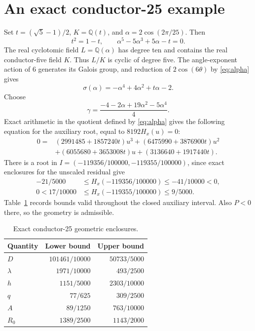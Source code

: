 \documentclass[noproofs]{rmj-public}
\theoremstyle{definition}
\numberwithin{equation}{section}
\newcommand{\Q}{\mathbb Q}
\begin{document}
\section{An exact conductor-25 example}\label{sec:example}

Set $t=(\sqrt5-1)/2$, $K=\Q(t)$, and
$\alpha=2\cos(2\pi/25)$. Then
\begin{equation}\label{eq:alpha}
t^2=1-t,\qquad \alpha^5-5\alpha^3+5\alpha-t=0.
\end{equation}
The real cyclotomic field $L=\Q(\alpha)$ has degree ten and contains
the real conductor-five field $K$. Thus $L/K$ is cyclic of degree five.
The angle-exponent action of 6 generates its Galois group, and reduction
of $2\cos(6\theta)$ by \eqref{eq:alpha} gives
\[
\sigma(\alpha)=-\alpha^4+4\alpha^2+t\alpha-2.
\]
Choose
\begin{equation}\label{eq:gamma25}
\gamma=\frac{-4-2\alpha+19\alpha^2-5\alpha^4}{4}.
\end{equation}
Exact arithmetic in the quotient defined by \eqref{eq:alpha} gives the
following equation for the auxiliary root, equal to $8192H_x(u)=0$:
\begin{equation}\label{eq:cubic25}
\begin{split}
0={}&(2991485+1857240t)u^3+(6475990+3876900t)u^2\\
&+(6055680+3653008t)u+(3136640+1917440t).
\end{split}
\end{equation}
There is a root in $I=(-119356/100000,-119355/100000)$, since exact
enclosures for the unscaled residual give
\begin{align*}
-21/5000&\le H_x(-119356/100000)\le-41/10000<0,\\
0<17/10000&\le H_x(-119355/100000)\le9/5000.
\end{align*}
Table~\ref{tab:example} records bounds valid throughout the closed
auxiliary interval. Also $P<0$ there, so the geometry is admissible.

\begin{table}[ht]
\centering
\caption{Exact conductor-25 geometric enclosures.}\label{tab:example}
\begin{tabular}{lrr}
\toprule Quantity&Lower bound&Upper bound\\\midrule
$D$&$101461/10000$&$50733/5000$\\
$\lambda$&$1971/10000$&$493/2500$\\
$h$&$1151/5000$&$2303/10000$\\
$q$&$77/625$&$309/2500$\\
$A$&$89/1250$&$763/10000$\\
$R_0$&$1389/2500$&$1143/2000$\\\bottomrule
\end{tabular}
\end{table}
\end{document}
